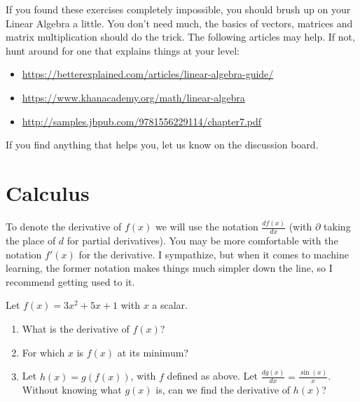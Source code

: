\documentclass[11pt]{article}
\begin{document}
\noindent If you found these exercises completely impossible, you should brush up on your Linear Algebra a little. You don't need much, the basics of vectors, matrices and matrix multiplication should do the trick. The following articles may help. If not, hunt around for one that explains things at your level:
\begin{itemize}
\item \url{https://betterexplained.com/articles/linear-algebra-guide/}
\item \url{https://www.khanacademy.org/math/linear-algebra}
\item \url{http://samples.jbpub.com/9781556229114/chapter7.pdf}
\end{itemize}
If you find anything that helps you, let us know on the discussion board.

\section{Calculus}

To denote the derivative of $f(x)$ we will use the notation $\frac{df(x)}{dx}$ (with $\partial$ taking the place of $d$ for partial derivatives). You may be more comfortable with the notation $f'(x)$ for the derivative. I sympathize, but when it comes to machine learning, the former notation makes things much simpler down the line, so I recommend getting used to it.

\begin{Exercise}
\noindent Let $f(x) = 3x^2 + 5x + 1$ with $x$ a scalar.
\begin{enumerate}
	\item What is the derivative of $f(x)$? 
	\item For which $x$ is $f(x)$ at its minimum? 
	\item Let $h(x) = g(f(x))$, with $f$ defined as above. Let $\frac{dg(x)}{dx} = \frac{\sin(x)}{x}$. Without knowing what $g(x)$ is, can we find the derivative of $h(x)$? 
\end{enumerate}
\end{Exercise}
\end{document}
